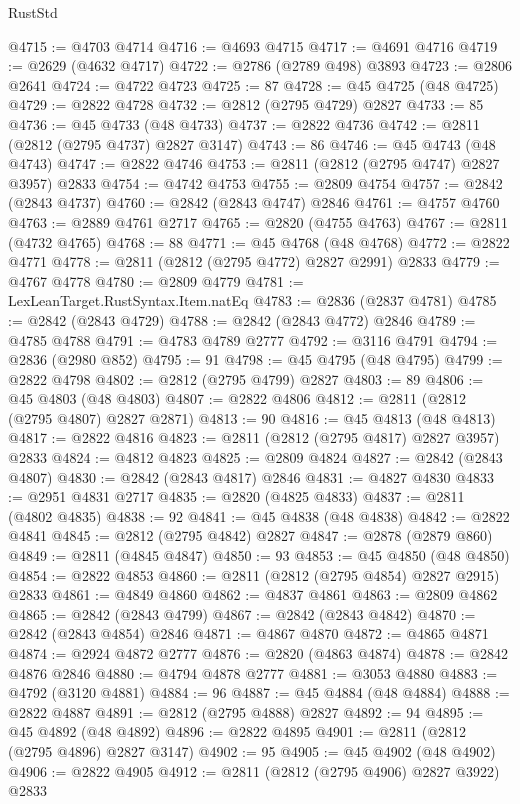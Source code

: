 \begin{lexlean}{RustStd}
\begin{coremodule}
@4715 := @4703 @4714
@4716 := @4693 @4715
@4717 := @4691 @4716
@4719 := @2629 (@4632 @4717)
@4722 := @2786 (@2789 @498) @3893
@4723 := @2806 @2641
@4724 := @4722 @4723
@4725 := 87
@4728 := @45 @4725 (@48 @4725)
@4729 := @2822 @4728
@4732 := @2812 (@2795 @4729) @2827
@4733 := 85
@4736 := @45 @4733 (@48 @4733)
@4737 := @2822 @4736
@4742 := @2811 (@2812 (@2795 @4737) @2827 @3147)
@4743 := 86
@4746 := @45 @4743 (@48 @4743)
@4747 := @2822 @4746
@4753 := @2811 (@2812 (@2795 @4747) @2827 @3957) @2833
@4754 := @4742 @4753
@4755 := @2809 @4754
@4757 := @2842 (@2843 @4737)
@4760 := @2842 (@2843 @4747) @2846
@4761 := @4757 @4760
@4763 := @2889 @4761 @2717
@4765 := @2820 (@4755 @4763)
@4767 := @2811 (@4732 @4765)
@4768 := 88
@4771 := @45 @4768 (@48 @4768)
@4772 := @2822 @4771
@4778 := @2811 (@2812 (@2795 @4772) @2827 @2991) @2833
@4779 := @4767 @4778
@4780 := @2809 @4779
@4781 := LexLeanTarget.RustSyntax.Item.natEq
@4783 := @2836 (@2837 @4781)
@4785 := @2842 (@2843 @4729)
@4788 := @2842 (@2843 @4772) @2846
@4789 := @4785 @4788
@4791 := @4783 @4789 @2777
@4792 := @3116 @4791
@4794 := @2836 (@2980 @852)
@4795 := 91
@4798 := @45 @4795 (@48 @4795)
@4799 := @2822 @4798
@4802 := @2812 (@2795 @4799) @2827
@4803 := 89
@4806 := @45 @4803 (@48 @4803)
@4807 := @2822 @4806
@4812 := @2811 (@2812 (@2795 @4807) @2827 @2871)
@4813 := 90
@4816 := @45 @4813 (@48 @4813)
@4817 := @2822 @4816
@4823 := @2811 (@2812 (@2795 @4817) @2827 @3957) @2833
@4824 := @4812 @4823
@4825 := @2809 @4824
@4827 := @2842 (@2843 @4807)
@4830 := @2842 (@2843 @4817) @2846
@4831 := @4827 @4830
@4833 := @2951 @4831 @2717
@4835 := @2820 (@4825 @4833)
@4837 := @2811 (@4802 @4835)
@4838 := 92
@4841 := @45 @4838 (@48 @4838)
@4842 := @2822 @4841
@4845 := @2812 (@2795 @4842) @2827
@4847 := @2878 (@2879 @860)
@4849 := @2811 (@4845 @4847)
@4850 := 93
@4853 := @45 @4850 (@48 @4850)
@4854 := @2822 @4853
@4860 := @2811 (@2812 (@2795 @4854) @2827 @2915) @2833
@4861 := @4849 @4860
@4862 := @4837 @4861
@4863 := @2809 @4862
@4865 := @2842 (@2843 @4799)
@4867 := @2842 (@2843 @4842)
@4870 := @2842 (@2843 @4854) @2846
@4871 := @4867 @4870
@4872 := @4865 @4871
@4874 := @2924 @4872 @2777
@4876 := @2820 (@4863 @4874)
@4878 := @2842 @4876 @2846
@4880 := @4794 @4878 @2777
@4881 := @3053 @4880
@4883 := @4792 (@3120 @4881)
@4884 := 96
@4887 := @45 @4884 (@48 @4884)
@4888 := @2822 @4887
@4891 := @2812 (@2795 @4888) @2827
@4892 := 94
@4895 := @45 @4892 (@48 @4892)
@4896 := @2822 @4895
@4901 := @2811 (@2812 (@2795 @4896) @2827 @3147)
@4902 := 95
@4905 := @45 @4902 (@48 @4902)
@4906 := @2822 @4905
@4912 := @2811 (@2812 (@2795 @4906) @2827 @3922) @2833

\end{coremodule}
\end{lexlean}
